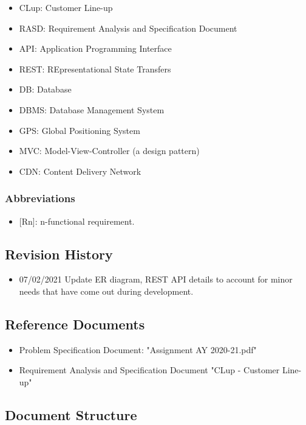 \begin{itemize}
    \item CLup: Customer Line-up
    \item RASD: Requirement Analysis and Specification Document
    \item API: Application Programming Interface
    \item REST: REpresentational State Transfers
    \item DB: Database
    \item DBMS: Database Management System
    \item GPS: Global Positioning System
    \item MVC: Model-View-Controller (a design pattern)
    \item CDN: Content Delivery Network
\end{itemize}


\subsubsection{Abbreviations}

\begin{itemize}
    \item {[Rn]}: n-functional requirement.
\end{itemize}

\subsection{Revision History}

\begin{itemize}
    \item 07/02/2021 Update ER diagram, REST API details to account for minor needs that have come out during development.
\end{itemize}

\subsection{Reference Documents}

\begin{itemize}
    \item Problem Specification Document: "Assignment AY 2020-21.pdf"
    \item Requirement Analysis and Specification Document "CLup - Customer Line-up"
\end{itemize}

\subsection{Document Structure}

